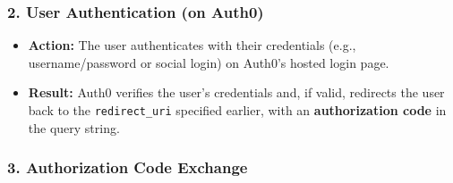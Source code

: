 \documentclass[11pt]{article}
\begin{document}
\subsubsection*{2. \textbf{User Authentication (on Auth0)}}
\begin{itemize}
    \item \textbf{Action:} The user authenticates with their credentials (e.g., username/password or social login) on Auth0's hosted login page.
    \item \textbf{Result:} Auth0 verifies the user's credentials and, if valid, redirects the user back to the \texttt{redirect\_uri} specified earlier, with an \textbf{authorization code} in the query string.
\end{itemize}

\subsubsection*{3. \textbf{Authorization Code Exchange}}
\end{document}
